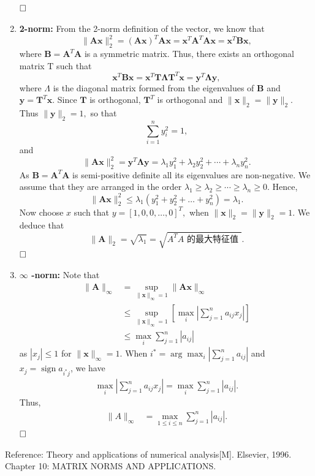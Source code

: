 \documentclass[11pt]{article}
\begin{document}
\begin{enumerate}
\begin{align*}
    \end{align*}
    $\hfill\square$
    \item \textbf{2-norm: } From the 2-norm definition of the vector, we know that
    $$
    \|\mathbf{A x}\|_{2}^{2}=(\mathbf{A} \mathbf{x})^{T} \mathbf{A} \mathbf{x}=\mathbf{x}^{T} \mathbf{A}^{T} \mathbf{A} \mathbf{x}=\mathbf{x}^{T} \mathbf{B} \mathbf{x},
    $$
    where $\mathbf{B}=\mathbf{A}^{T} \mathbf{A}$ is a symmetric matrix. Thus, there exists an orthogonal matrix $\mathrm{T}$ such that
    $$
    \mathbf{x}^{T} \mathbf{B} \mathbf{x}=\mathbf{x}^{T} \mathbf{T} \boldsymbol{\Lambda} \mathbf{T}^{T} \mathbf{x}=\mathbf{y}^{T} \boldsymbol{\Lambda} \mathbf{y},
    $$
    where $\Lambda$ is the diagonal matrix formed from the eigenvalues of $\mathbf{B}$ and $\mathbf{y}=\mathbf{T}^{T} \mathbf{x} .$ Since $\mathbf{T}$ is orthogonal, $\mathbf{T}^{T}$ is orthogonal and $\|\mathbf{x}\|_{2}=\|\mathbf{y}\|_{2}$. Thus $\|\mathbf{y}\|_{2}=1,$ so that
    $$
    \sum_{i=1}^{n} y_{i}^{2}=1,
    $$
    and
    $$
    \|\mathbf{A x}\|_{2}^{2}=\mathbf{y}^{T} \boldsymbol{\Lambda} \mathbf{y}=\lambda_{1} y_{1}^{2}+\lambda_{2} y_{2}^{2}+\cdots+\lambda_{n} y_{n}^{2}.
    $$
    As $\mathbf{B}=\mathbf{A}^{T} \mathbf{A}$ is semi-positive definite all its eigenvalues are non-negative. We assume that they are arranged in the order $\lambda_{1} \geq \lambda_{2} \geq \cdots \geq \lambda_{n} \geq 0 .$ Hence,
    $$
    \|\mathbf{A} \mathbf{x}\|_{2}^{2} \leq \lambda_{1}\left(y_{1}^{2}+y_{2}^{2}+\ldots+y_{n}^{2}\right)=\lambda_{1}.
    $$
    Now choose $x$ such that $y=[1, 0, 0, \ldots, 0]^{T},$ when $\|\mathbf{x}\|_{2}=\|\mathbf{y}\|_{2}=1$. We deduce that
    $$
    \|\mathbf{A}\|_{2}=\sqrt{\lambda_{1}}=\sqrt{A^{T} A \text { 的最大特征值 }}.
    $$
    $\hfill\square$
    \item \textbf{$\infty$ -norm: }Note that
    \begin{align*}
        \|\mathbf{A}\|_{\infty} &=\sup_{\|\mathbf{x}\|_\infty=1}\|\mathbf{A} \mathbf{x}\|_{\infty} \\
        & \leq \sup_{\|\mathbf{x}\|_{\infty}=1}\left[\max _{i}\left|\sum_{j=1}^{n} a_{i j} x_{j}\right|\right] \\
        & \leq \max _{i} \sum_{j=1}^{n}\left|a_{i j}\right|
    \end{align*}
    as $\left|x_{j}\right| \leq 1$ for $\|\mathbf{x}\|_{\infty}=1.$ When $i^*=\arg\max_i |\sum_{j=1}^{n} a_{ij}|$ and $x_j=\operatorname{sign} a_{i^*j}$, we have 
    \begin{align*}
        \max _i\left|\sum_{j=1}^{n} a_{i j} x_{j}\right|=\max _{i} \sum_{j=1}^{n} |a_{i j} |.
    \end{align*}
    Thus,
    \begin{align*}
        \|A\|_{\infty}&=\max _{1 \leq i \leq n} \sum_{j=1}^{n}\left|a_{i j}\right|.
    \end{align*}
    $\hfill\square$
\end{enumerate}
Reference: Theory and applications of numerical analysis[M]. Elsevier, 1996. Chapter 10: MATRIX NORMS AND APPLICATIONS.
\end{document}
